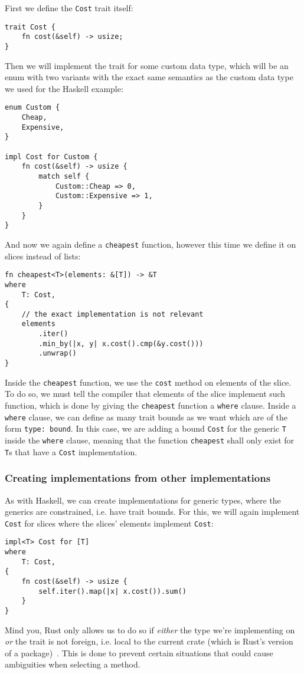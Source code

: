 First we define the \verb|Cost| trait itself:
\begin{verbatim}
trait Cost {
    fn cost(&self) -> usize;
}
\end{verbatim}
Then we will implement the trait for some custom data type, which will be an enum with two variants with the exact same semantics as the custom data type we used for the Haskell example:
\begin{verbatim}
enum Custom {
    Cheap,
    Expensive,
}

impl Cost for Custom {
    fn cost(&self) -> usize {
        match self {
            Custom::Cheap => 0,
            Custom::Expensive => 1,
        }
    }
}
\end{verbatim}
And now we again define a \verb|cheapest| function, however this time we define it on slices instead of lists:
\begin{verbatim}
fn cheapest<T>(elements: &[T]) -> &T
where
    T: Cost,
{
    // the exact implementation is not relevant
    elements
        .iter()
        .min_by(|x, y| x.cost().cmp(&y.cost()))
        .unwrap()
}
\end{verbatim}
Inside the \verb|cheapest| function, we use the \verb|cost| method on elements of the slice. To do so, we must tell the compiler that elements of the slice implement such function, which is done by giving the \verb|cheapest| function a \verb|where| clause. Inside a \verb|where| clause, we can define as many trait bounds as we want which are of the form \verb|type: bound|. In this case, we are adding a bound \verb|Cost| for the generic \verb|T| inside the \verb|where| clause, meaning that the function \verb|cheapest| shall only exist for \verb|T|s that have a \verb|Cost| implementation.

\subsubsection{Creating implementations from other implementations}

As with Haskell, we can create implementations for generic types, where the generics are constrained, i.e. have trait bounds. For this, we will again implement \verb|Cost| for slices where the slices' elements implement \verb|Cost|:
\begin{verbatim}
impl<T> Cost for [T]
where
    T: Cost,
{
    fn cost(&self) -> usize {
        self.iter().map(|x| x.cost()).sum()
    }
}
\end{verbatim}
Mind you, Rust only allows us to do so if \textit{either} the type we're implementing on \textit{or} the trait is not foreign, i.e. local to the current crate (which is Rust's version of a package)~\cite{rust-book}. This is done to prevent certain situations that could cause ambiguities when selecting a method.

